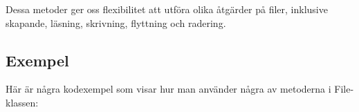 Dessa metoder ger oss flexibilitet att utföra olika åtgärder på filer,
inklusive skapande, läsning, skrivning, flyttning och radering.

\hypertarget{exempel}{%
\subsection{Exempel}\label{exempel}}

Här är några kodexempel som visar hur man använder några av metoderna i
File-klassen:

\hypertarget{cb1}{}
\begin{Shaded}
\begin{Highlighting}[]
 \OperatorTok{;}
 \OperatorTok{;}
 \OperatorTok{;}
 \OperatorTok{;}

 \OperatorTok{\{}
       \OperatorTok{(}\OperatorTok{[]}\OperatorTok{)} \OperatorTok{\{}
        \OperatorTok{=} \SpecialCharTok{\textbackslash{}\textbackslash{}}\SpecialCharTok{\textbackslash{}\textbackslash{}}\OperatorTok{;}

         \OperatorTok{\{}
             \OperatorTok{(!}\OperatorTok{(}\OperatorTok{(}\OperatorTok{)))} \OperatorTok{\{}
\OperatorTok{(}\OperatorTok{(}\OperatorTok{));}
            \OperatorTok{\}}
        \OperatorTok{\}}  \OperatorTok{(}\OperatorTok{)} \OperatorTok{\{}
\OperatorTok{();}
        \OperatorTok{\}}


\end{Highlighting}
\end{Shaded}

